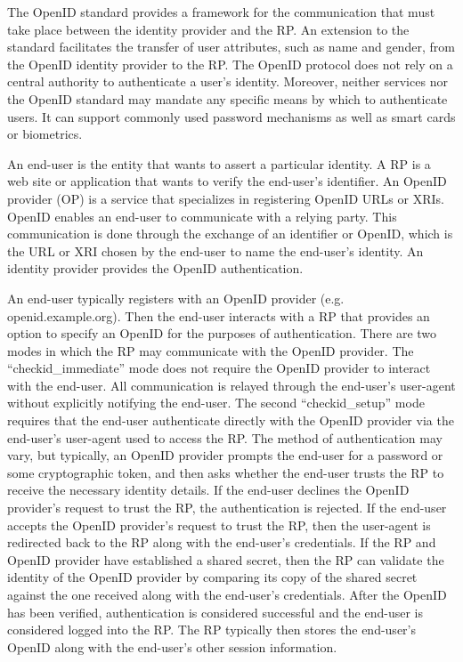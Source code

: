 \begin{multicols}{2}
The OpenID standard provides a framework for the communication that must take place between the identity provider and the RP. An extension to the standard facilitates the transfer of user attributes, such as name and gender, from the OpenID identity provider to the RP. The OpenID protocol does not rely on a central authority to authenticate a user's identity. Moreover, neither services nor the OpenID standard may mandate any specific means by which to authenticate users. It can support commonly used password mechanisms as well as smart cards or biometrics.

An end-user is the entity that wants to assert a particular identity. A RP is a web site or application that wants to verify the end-user's identifier. An OpenID provider (OP) is a service that specializes in registering OpenID URLs or XRIs. OpenID enables an end-user to communicate with a relying party. This communication is done through the exchange of an identifier or OpenID, which is the URL or XRI chosen by the end-user to name the end-user's identity. An identity provider provides the OpenID authentication.

An end-user typically registers with an OpenID provider (e.g. openid.example.org). Then the end-user interacts with a RP that provides an option to specify an OpenID for the purposes of authentication. There are two modes in which the RP may communicate with the OpenID provider. The ``checkid\_immediate'' mode does not require the OpenID provider to interact with the end-user. All communication is relayed through the end-user's user-agent without explicitly notifying the end-user. The second ``checkid\_setup'' mode requires that the end-user authenticate directly with the OpenID provider via the end-user's user-agent used to access the RP. The method of authentication may vary, but typically, an OpenID provider prompts the end-user for a password or some cryptographic token, and then asks whether the end-user trusts the RP to receive the necessary identity details. If the end-user declines the OpenID provider's request to trust the RP, the authentication is rejected. If the end-user accepts the OpenID provider's request to trust the RP, then the user-agent is redirected back to the RP along with the end-user's credentials. If the RP and OpenID provider have established a shared secret, then the RP can validate the identity of the OpenID provider by comparing its copy of the shared secret against the one received along with the end-user's credentials. After the OpenID has been verified, authentication is considered successful and the end-user is considered logged into the RP. The RP typically then stores the end-user's OpenID along with the end-user's other session information.


\end{multicols}
